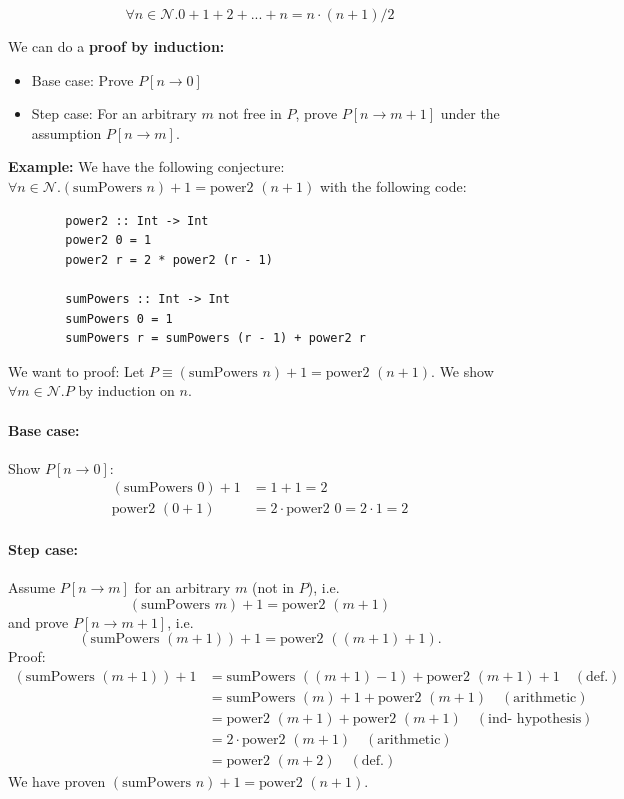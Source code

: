 \documentclass[a4paper]{extarticle}
\begin{document}
\[
    \forall n \in \mathcal{N} . 0 + 1 + 2 + ... + n = n \cdot (n + 1) / 2
\]

We can do a \textbf{proof by induction:}

\begin{itemize}
    \item Base case: Prove \(P[n \to 0]\)
    \item Step case: For an arbitrary \(m\) not free in \(P\), prove \(P[n \to m + 1]\) under the assumption \(P[n \to m]\).
\end{itemize}

\begin{ebox}
    \textbf{Example:} We have the following conjecture: \(\forall n \in \mathcal{N}.(\text{sumPowers } n) + 1 = \text{power2 } (n + 1)\) with the following code:

    \begin{verbatim}
        power2 :: Int -> Int
        power2 0 = 1
        power2 r = 2 * power2 (r - 1)

        sumPowers :: Int -> Int
        sumPowers 0 = 1
        sumPowers r = sumPowers (r - 1) + power2 r
    \end{verbatim}

    We want to proof: Let \(P \equiv (\text{sumPowers } n) + 1 = \text{power2 } (n + 1)\). We show \(\forall m \in \mathcal{N} . P\) by induction on \(n\).

    \paragraph{Base case:} Show \(P[n \to 0]\):
    \begin{align*}
        (\text{sumPowers } 0) + 1 &= 1 + 1 = 2 \\
        \text{power2 } (0 + 1) &= 2 \cdot \text{power2 } 0 = 2 \cdot 1 = 2
    \end{align*}

    \paragraph{Step case:} Assume \(P[n \to m]\) for an arbitrary \(m\) (not in \(P\)), i.e.
    \[
        (\text{sumPowers } m) + 1 = \text{power2 } (m + 1)  
    \]
    and prove \(P[n \to m + 1]\), i.e.
    \[
        (\text{sumPowers } (m + 1)) + 1 = \text{power2 } ((m + 1) + 1).  
    \]
    Proof:
    \begin{align*}
        (\text{sumPowers } (m + 1)) + 1 &= \text{sumPowers } ((m + 1) - 1) + \text{power2 } (m + 1) + 1 \quad (\text{def.}) \\
        &= \text{sumPowers } (m) + 1 + \text{power2 } (m + 1) \quad (\text{arithmetic}) \\
        &= \text{power2 } (m + 1) + \text{power2 } (m + 1) \quad (\text{ind- hypothesis}) \\
        &= 2 \cdot \text{power2 } (m + 1) \quad (\text{arithmetic}) \\
        &= \text{power2 } (m + 2) \quad (\text{def.})
    \end{align*}
    We have proven \((\text{sumPowers } n) + 1 = \text{power2 } (n + 1)\).
\end{ebox}
\end{document}

